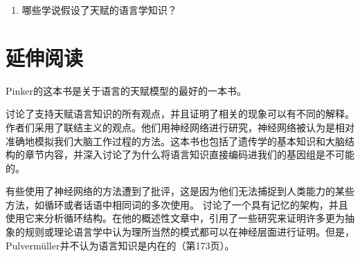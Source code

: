 \begin{enumerate}
\item 哪些学说假设了天赋的语言学知识？
\end{enumerate} 


\section*{延伸阅读}

Pinker的\citeyearpar{Pinker94a}这本书是关于语言的天赋模型的最好的一本书。

\citet*{EBJKSPP96a}讨论了支持天赋语言知识的所有观点，并且证明了相关的现象可以有不同的解释。作者们采用了联结主义的观点。他们用神经网络进行研究，神经网络被认为是相对准确地模拟我们大脑工作过程的方法。这本书也包括了遗传学的基本知识和大脑结构的章节内容，并深入讨论了为什么将语言知识直接编码进我们的基因组是不可能的。

有些使用了神经网络的方法遭到了批评，这是因为他们无法捕捉到人类能力的某些方法，如循环或者话语中相同词的多次使用。
 \citet{Pulvermueller2010a}讨论了一个具有记忆的架构，并且使用它来分析循环结构。在他的概述性文章中，引用了一些研究来证明许多更为抽象的规则或理论语言学中认为理所当然的模式都可以在神经层面进行证明。但是，Pulvermüller并不认为语言知识是内在的（第173页）。


